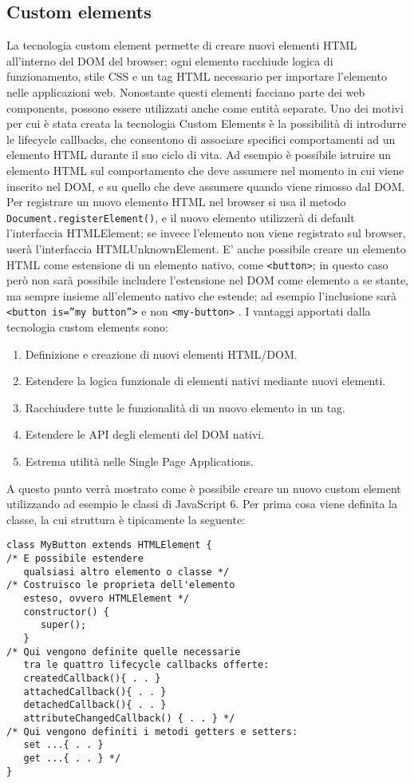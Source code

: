 \subsection{Custom elements}
\label{sec:chapter_tecnologie_abilitanti_custom_elements}

La tecnologia custom element permette di creare nuovi elementi HTML all’interno del DOM del browser; ogni elemento racchiude logica di funzionamento, stile CSS e un tag HTML necessario per importare l’elemento nelle applicazioni web. 
Nonostante questi elementi facciano parte dei web components, possono essere utilizzati anche come entità separate. Uno dei motivi per cui è stata creata la tecnologia Custom Elements è la possibilità di introdurre le lifecycle callbacks, che consentono di associare specifici comportamenti ad un elemento HTML durante il suo ciclo di vita. Ad esempio è possibile istruire un elemento HTML sul comportamento che deve assumere nel momento in cui viene inserito nel DOM, e su quello che deve assumere quando viene rimosso dal DOM. 
Per registrare un nuovo elemento HTML nel browser si usa il metodo \texttt{Document.registerElement()}, e il nuovo elemento utilizzerà di default l’interfaccia HTMLElement; se invece l’elemento non viene registrato sul browser, userà l’interfaccia HTMLUnknownElement. E’ anche possibile creare un elemento HTML come estensione di un elemento nativo, come \texttt{<button>}; in questo caso però non sarà possibile includere l’estensione nel DOM come elemento a se stante, ma sempre insieme all’elemento nativo che estende; ad esempio l’inclusione sarà \texttt{<button is=”my button”>} e non \texttt{<my-button>} .
I vantaggi apportati dalla tecnologia custom elements sono:
\begin{enumerate}
\item Definizione e creazione di nuovi elementi HTML/DOM.
\item Estendere la logica funzionale di elementi nativi mediante nuovi elementi.
\item Racchiudere tutte le funzionalità di un nuovo elemento in un tag.
\item Estendere le API degli elementi del DOM nativi.
\item Estrema utilità nelle Single Page Applications.
\end{enumerate}
A questo punto verrà mostrato come è possibile creare un nuovo custom element utilizzando ad esempio le classi di JavaScript 6.
Per prima cosa viene definita la classe, la cui struttura è tipicamente la seguente:
\begin{lstlisting}
class MyButton extends HTMLElement {    
/* E possibile estendere 
   qualsiasi altro elemento o classe */
/* Costruisco le proprieta dell'elemento 
   esteso, ovvero HTMLElement */     
   constructor() {          
      super();                         
   }   								  
/* Qui vengono definite quelle necessarie 
   tra le quattro lifecycle callbacks offerte:
   createdCallback(){ . . } 
   attachedCallback(){ . . } 
   detachedCallback(){ . . } 
   attributeChangedCallback() { . . } */
/* Qui vengono definiti i metodi getters e setters:
   set ...{ . . } 
   get ...{ . . } */
}
\end{lstlisting}
